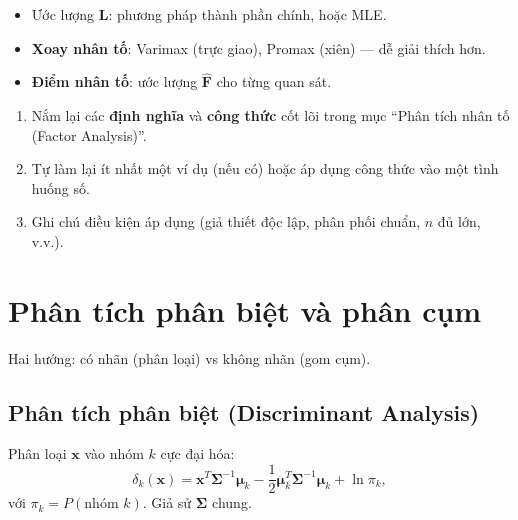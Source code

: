 \documentclass[12pt,a4paper]{article}
\begin{document}
\begin{phuongphap}[title={Ước lượng và xoay}]
  \begin{itemize}
    \item Ước lượng $\mathbf{L}$: phương pháp thành phần chính, hoặc MLE.
    \item \textbf{Xoay nhân tố}: Varimax (trực giao), Promax (xiên) --- dễ giải thích hơn.
    \item \textbf{Điểm nhân tố}: ước lượng $\hat{\mathbf{F}}$ cho từng quan sát.
  \end{itemize}
\end{phuongphap}


\begin{tongket}[title={Tổng kết: Phân tích nhân tố (Factor Analysis)}]
\begin{enumerate}
  \item Nắm lại các \textbf{định nghĩa} và \textbf{công thức} cốt lõi trong mục ``Phân tích nhân tố (Factor Analysis)''.
  \item Tự làm lại ít nhất một ví dụ (nếu có) hoặc áp dụng công thức vào một tình huống số.
  \item Ghi chú điều kiện áp dụng (giả thiết độc lập, phân phối chuẩn, $n$ đủ lớn, v.v.).
\end{enumerate}
\end{tongket}

\section{Phân tích phân biệt và phân cụm}

\begin{dongco}[title={Động cơ --- Phân tích phân biệt và phân cụm}]
Hai hướng: có nhãn (phân loại) vs không nhãn (gom cụm).
\end{dongco}

\subsection{Phân tích phân biệt (Discriminant Analysis)}

\begin{dinhnghia}[title={LDA (Linear Discriminant Analysis)}]
  Phân loại $\mathbf{x}$ vào nhóm $k$ cực đại hóa:
  \[
    \delta_k(\mathbf{x}) = \mathbf{x}^T\boldsymbol{\Sigma}^{-1}\boldsymbol{\mu}_k - \frac{1}{2}\boldsymbol{\mu}_k^T\boldsymbol{\Sigma}^{-1}\boldsymbol{\mu}_k + \ln\pi_k,
  \]
  với $\pi_k = P(\text{nhóm } k)$. Giả sử $\boldsymbol{\Sigma}$ chung.
\end{dinhnghia}
\end{document}

